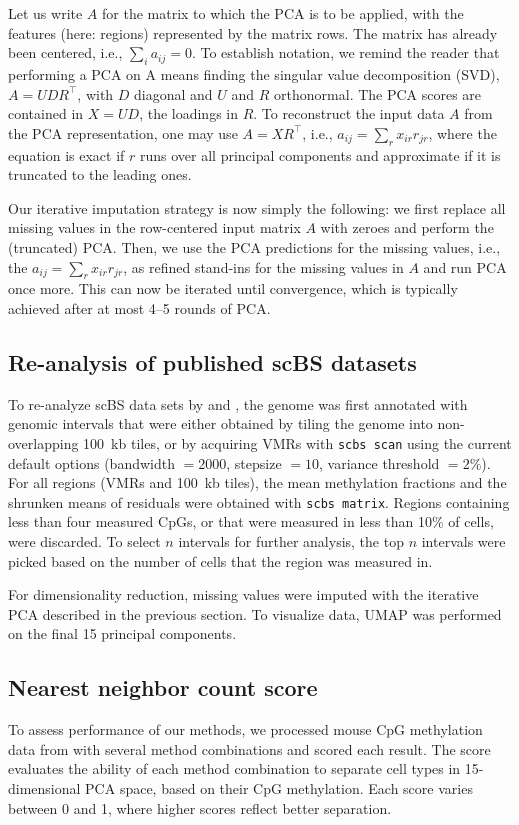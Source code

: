 \documentclass[twocolumn,10pt]{article}
\begin{document}
Let us write $A$ for the matrix to which the PCA is to be applied, with the features (here: regions) represented by the matrix rows.
The matrix has already been centered, i.e., $\sum_i a_{ij}=0$.
To establish notation, we remind the reader that performing a PCA on A means finding the singular value decomposition (SVD), $A=UDR^\top$, with $D$ diagonal and $U$ and $R$ orthonormal.
The PCA scores are contained in $X=UD$, the loadings in $R$.
To reconstruct the input data $A$ from the PCA representation, one may use $A=XR^\top$, i.e., $a_{ij}=\sum_r x_{ir} r_{jr}$, where the equation is exact if $r$ runs over all principal components and approximate if it is truncated to the leading ones.

Our iterative imputation strategy is now simply the following: we first replace all missing values in the row-centered input matrix $A$ with zeroes and perform the (truncated) PCA.
Then, we use the PCA predictions for the missing values, i.e., the $a_{ij}=\sum_r x_{ir} r_{jr}$, as refined stand-ins for the missing values in $A$ and run PCA once more.
This can now be iterated until convergence, which is typically achieved after at most 4--5 rounds of PCA.

\subsection{Re-analysis of published scBS datasets}
To re-analyze scBS data sets by \citet{luo2017single} and \citet{argelaguet2019gastru}, the genome was first annotated with genomic intervals that were either obtained by tiling the genome into non-overlapping 100~kb tiles, or by acquiring VMRs with \texttt{scbs scan} using the current default options (bandwidth $=2000$, stepsize $=10$, variance threshold $= 2\%$).
For all regions (VMRs and 100~kb tiles), the mean methylation fractions and the shrunken means of residuals were obtained with \texttt{scbs matrix}.
Regions containing less than four measured CpGs, or that were measured in less than 10\% of cells, were discarded.
To select $n$ intervals for further analysis, the top $n$ intervals were picked based on the number of cells that the region was measured in.

For dimensionality reduction, missing values were imputed with the iterative PCA described in the previous section.
To visualize data, UMAP was performed on the final 15 principal components.

\subsection{Nearest neighbor count score} \label{methods:score}
To assess performance of our methods, we processed mouse CpG methylation data from \citet{luo2017single} with several method combinations and scored each result.
The score evaluates the ability of each method combination to separate cell types in 15-dimensional PCA space, based on their CpG methylation.
Each score varies between 0 and 1, where higher scores reflect better separation.
\end{document}
